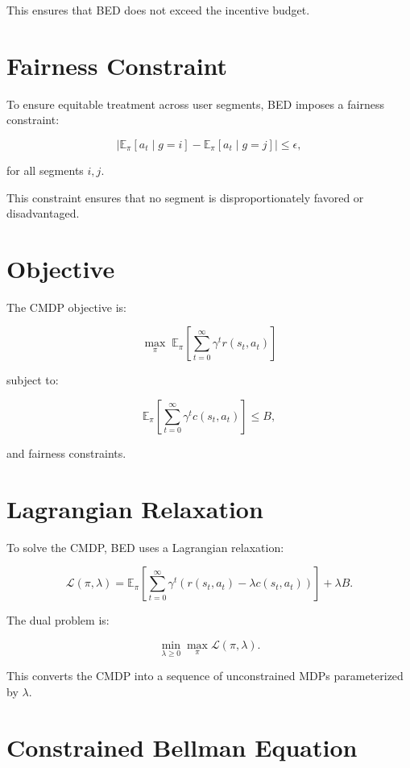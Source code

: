 This ensures that BED does not exceed the incentive budget.

\section{Fairness Constraint}

To ensure equitable treatment across user segments, BED imposes a fairness
constraint:


\[
\left| \mathbb{E}_{\pi}[a_t \mid g = i] - \mathbb{E}_{\pi}[a_t \mid g = j] \right|
\le \epsilon,
\]


for all segments $i, j$.

This constraint ensures that no segment is disproportionately favored or
disadvantaged.

\section{Objective}

The CMDP objective is:


\[
\max_{\pi} \; \mathbb{E}_{\pi} \left[ \sum_{t=0}^{\infty} \gamma^t r(s_t, a_t) \right]
\]


subject to:


\[
\mathbb{E}_{\pi} \left[ \sum_{t=0}^{\infty} \gamma^t c(s_t, a_t) \right] \le B,
\]


and fairness constraints.

\section{Lagrangian Relaxation}

To solve the CMDP, BED uses a Lagrangian relaxation:


\[
\mathcal{L}(\pi, \lambda) =
\mathbb{E}_{\pi} \left[ \sum_{t=0}^{\infty} \gamma^t
\left( r(s_t, a_t) - \lambda c(s_t, a_t) \right) \right]
+ \lambda B.
\]



The dual problem is:


\[
\min_{\lambda \ge 0} \max_{\pi} \mathcal{L}(\pi, \lambda).
\]



This converts the CMDP into a sequence of unconstrained MDPs parameterized by
$\lambda$.

\section{Constrained Bellman Equation}

